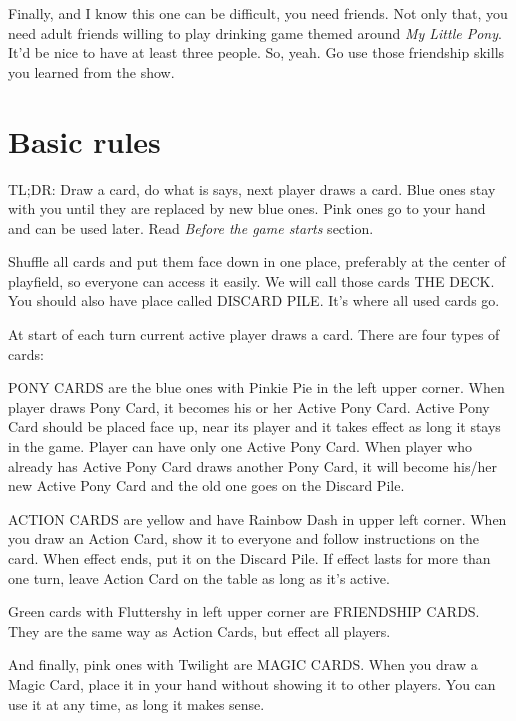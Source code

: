 \documentclass[notitlepage]{article}
\begin{document}
Finally, and I know this one can be difficult, you need friends. Not only that, you need adult friends willing to play drinking game themed around \textsl{My Little Pony}. It'd be nice to have at least three people. So, yeah. Go use those friendship skills you learned from the show.

\section{Basic rules}
TL;DR: Draw a card, do what is says, next player draws a card. Blue ones stay with you until they are replaced by new blue ones. Pink ones go to your hand and can be used later. Read \textsl{Before the game starts} section.

Shuffle all cards and put them face down in one place, preferably at the center of playfield, so everyone can access it easily. We will call those cards THE DECK. You should also have place called DISCARD PILE. It's where all used cards go.


At start of each turn current active player draws a card. There are four types of cards:

PONY CARDS are the blue ones with Pinkie Pie in the left upper corner. When player draws Pony Card, it becomes his or her Active Pony Card. Active Pony Card should be placed face up, near its player and it takes effect as long it stays in the game. Player can have only one Active Pony Card. When player who already has Active Pony Card draws another Pony Card, it will become his/her new Active Pony Card and the old one goes on the Discard Pile.

ACTION CARDS are yellow and have Rainbow Dash in upper left corner. When you draw an Action Card, show it to everyone and follow instructions on the card. When effect ends, put it on the Discard Pile. If effect lasts for more than one turn, leave Action Card on the table as long as it's active.

Green cards with Fluttershy in left upper corner are FRIENDSHIP CARDS. They are the same way as Action Cards, but effect all players.

And finally, pink ones with Twilight are MAGIC CARDS. When you draw a Magic Card, place it in your hand without showing it to other players. You can use it at any time, as long it makes sense.
\end{document}
